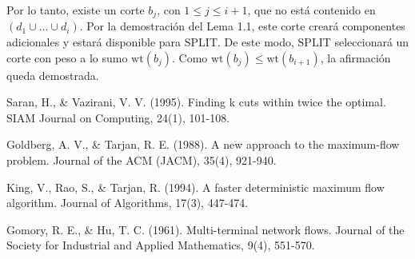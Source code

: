 \documentclass[a4paper, 12pt]{article}
\begin{document}
Por lo tanto, existe un corte \( b_j \), con \( 1 \leq j \leq i + 1 \), que no está contenido en \( (d_1 \cup \dots \cup d_i) \). Por la demostración del Lema 1.1, este corte creará componentes adicionales y estará disponible para SPLIT. De este modo, SPLIT seleccionará un corte con peso a lo sumo \( \text{wt}(b_j) \). Como \( \text{wt}(b_j) \leq \text{wt}(b_{i+1}) \), la afirmación queda demostrada.

\begin{thebibliography}{9}
Saran, H., \& Vazirani, V. V. (1995). Finding k cuts within twice the optimal. SIAM Journal on Computing, 24(1), 101-108.

Goldberg, A. V., \& Tarjan, R. E. (1988). A new approach to the maximum-flow problem. Journal of the ACM (JACM), 35(4), 921-940.

King, V., Rao, S., \& Tarjan, R. (1994). A faster deterministic maximum flow algorithm. Journal of Algorithms, 17(3), 447-474.

Gomory, R. E., \& Hu, T. C. (1961). Multi-terminal network flows. Journal of the Society for Industrial and Applied Mathematics, 9(4), 551-570.
\end{thebibliography}
\end{document}
